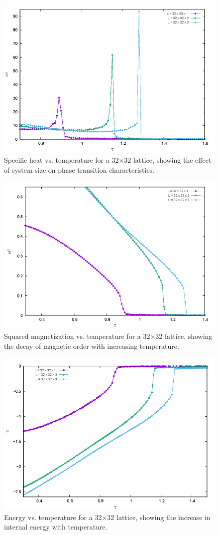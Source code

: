 \documentclass[conference, compsoc, twoside]{IEEEtran}
\begin{document}
\begin{figure}[ht]
    \centering
    \includegraphics[width=0.9\columnwidth]{Gambar 21. Cv vs T pada Kisi 32 x 32.png}
    \caption{Specific heat vs. temperature for a 32×32 lattice, showing the effect of system size on phase transition characteristics.}
    \label{fig:cv_32x32}
\end{figure}

\begin{figure}[ht]
    \centering
    \includegraphics[width=0.9\columnwidth]{Gambar 25. M^2 vs T pada Kisi 32x32.png}
    \caption{Squared magnetization vs. temperature for a 32×32 lattice, showing the decay of magnetic order with increasing temperature.}
    \label{fig:m2_32x32}
\end{figure}

\begin{figure}[ht]
    \centering
    \includegraphics[width=0.9\columnwidth]{Gambar 29. E vs T pada Kisi 32x32.png}
    \caption{Energy vs. temperature for a 32×32 lattice, showing the increase in internal energy with temperature.}
    \label{fig:e_32x32}
\end{figure}
\end{document}

